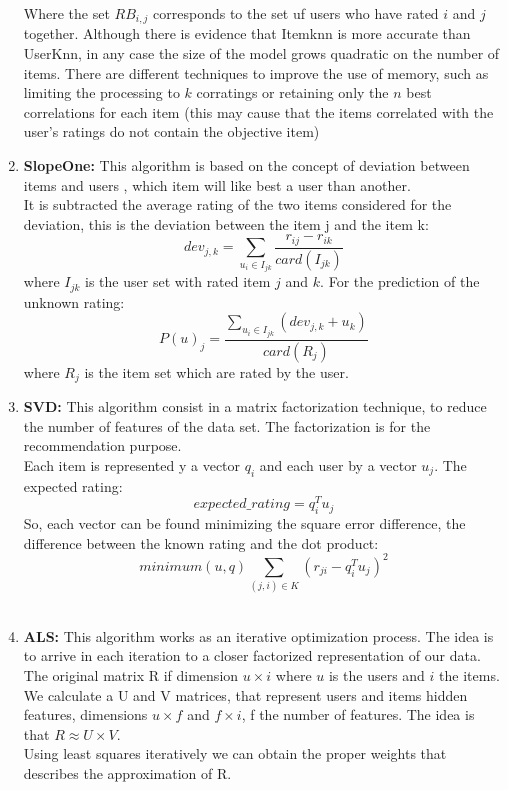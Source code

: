 \documentclass[letterpaper, 10 pt, conference]{ieeeconf}  %
\begin{document}
\begin{enumerate}
    Where the set $RB_{i,j}$ corresponds to the set uf users who have rated $i$ and $j$ together. Although there is evidence that Itemknn is more accurate than UserKnn, in any case the size of the model grows quadratic on the number of items. There are different techniques to improve the use of memory, such as limiting the processing to $k$ corratings or retaining only the $n$ best correlations for each item (this may cause that the items correlated with the user's ratings do not contain the objective item)
    
    \item \textbf{SlopeOne: }
    This algorithm is based on the concept of deviation between items and users \cite{c7}, which item will like best a user than another.\\
    It is subtracted the average rating of the two items considered for the deviation, this is the deviation between the item j and the item k:
    \begin{equation}
        dev_{j,k} = \sum_{u_i\in I_{jk}} \frac{r_{ij}-r_{ik}}{card(I_{jk})}
    \end{equation}
    where $I_{jk}$ is the user set with rated item $j$ and $k$.
    For the prediction of the unknown rating:
    \begin{equation}
        P(u)_j = \frac{\sum_{u_i\in I_{jk}}(dev_{j,k}+u_k)}{card(R_j)}
    \end{equation}
    where $R_j$ is the item set which are rated by the user.\\
    
    \item \textbf{SVD: }
    This algorithm consist in a matrix factorization technique, to reduce the number of features of the data set. The factorization is for the recommendation purpose.\\
    Each item is represented y a vector $q_i$ and each user by a vector $u_j$. The expected rating:
    \begin{equation}
        expected\_rating = q_i^Tu_j
    \end{equation}
    So, each vector can be found minimizing the square error difference, the difference between the known rating and the dot product:
    \begin{equation}
        minimum(u,q) \sum_{(j,i)\in K}(r_{ji}-q_i^Tu_j)^2
    \end{equation}
    \\
    
    \item \textbf{ALS: } 
    This algorithm works as an iterative optimization process. The idea is to arrive in each iteration to a closer factorized representation of our data.\\
    The original matrix R if dimension $u\times i$ where $u$ is the users and $i$ the items. We calculate a U and V matrices, that represent users and items hidden features, dimensions $u\times f$ and $f \times i$, f the number of features. The idea is that $R\approx U\times V$.\\
    Using least squares iteratively we can obtain the proper weights that describes the approximation of R.\\
    

\end{enumerate}
\end{document}
